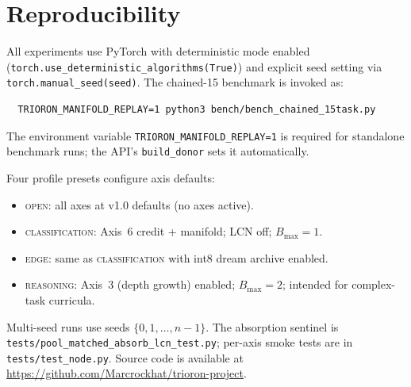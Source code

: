 \documentclass[11pt]{article}
\begin{document}
\section{Reproducibility}
\label{sec:repro}

All experiments use PyTorch with deterministic mode enabled
(\texttt{torch.use\_deterministic\_algorithms(True)}) and explicit seed
setting via \texttt{torch.manual\_seed(seed)}.
The chained-15 benchmark is invoked as:
\begin{verbatim}
  TRIORON_MANIFOLD_REPLAY=1 python3 bench/bench_chained_15task.py
\end{verbatim}
The environment variable \texttt{TRIORON\_MANIFOLD\_REPLAY=1} is
required for standalone benchmark runs; the API's
\texttt{build\_donor} sets it automatically.

Four profile presets configure axis defaults:
\begin{itemize}[nosep]
  \item \textsc{open}: all axes at v1.0 defaults (no axes active).
  \item \textsc{classification}: Axis~6 credit + manifold; LCN off;
    $B_{\max}{=}1$.
  \item \textsc{edge}: same as \textsc{classification} with int8 dream
    archive enabled.
  \item \textsc{reasoning}: Axis~3 (depth growth) enabled;
    $B_{\max}{=}2$; intended for complex-task curricula.
\end{itemize}
Multi-seed runs use seeds $\{0, 1, \ldots, n{-}1\}$.
The absorption sentinel is
\texttt{tests/pool\_matched\_absorb\_lcn\_test.py}; per-axis smoke tests
are in \texttt{tests/test\_node.py}.
Source code is available at \url{https://github.com/Marcrockhat/trioron-project}.




\end{document}
